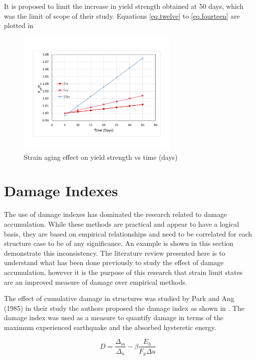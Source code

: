 It is proposed to limit the increase in yield strength obtained at 50 days, which was the limit of scope of their study. Equations \ref{eq.twelve} to  \ref{eq.fourteen} are plotted in 

\begin{figure}[htbp]
\centering
\includegraphics[width=0.7\textwidth]{Chapter-2/figs/StrainAging_TimeDependent}
\caption{Strain aging effect on yield strength vs time (days)}
\label{fig:hist4}
\end{figure}

\section{Damage Indexes}
The use of damage indexes has dominated the research related to damage accumulation. While these methods are practical and appear to have a logical basis, they are based on empirical relationships and need to be correlated for each structure case to be of any significance. An example is shown in this section demonstrate this inconsistency.  The literature review presented here is to understand what has been done previously to study the effect of damage accumulation, however it is the purpose of this research that strain limit states are an improved measure of damage over empirical methods.

The effect of cumulative damage in structures was studied by Park and Ang (1985) \cite{Young-JiPark1985} in their study the authors proposed the damage index as shown in . The damage index was used as a measure to quantify damage in terms of the maximum experienced earthquake and the absorbed hysteretic energy.

\begin{equation}
  D=\frac{\Delta_{m}}{\Delta_{u}}-\beta \frac{E_h}{F_{y}\Delta{u}}
  \label{eq.DamageIndex}
\end{equation} 

